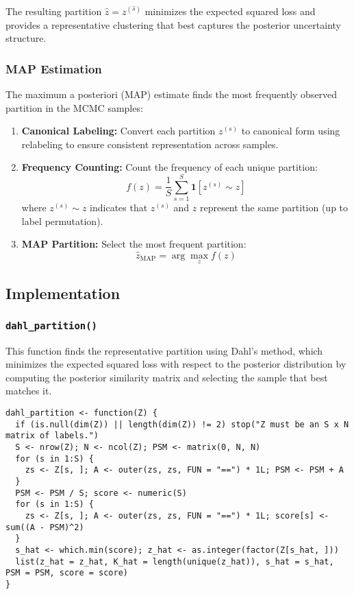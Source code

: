 \documentclass[11pt]{article}
\begin{document}
The resulting partition $\hat{z} = z^{(\hat{s})}$ minimizes the expected squared loss and provides a representative clustering that best captures the posterior uncertainty structure.

\subsubsection{MAP Estimation}

The maximum a posteriori (MAP) estimate finds the most frequently observed partition in the MCMC samples:

\begin{enumerate}
\item \textbf{Canonical Labeling:} Convert each partition $z^{(s)}$ to canonical form using relabeling to ensure consistent representation across samples.

\item \textbf{Frequency Counting:} Count the frequency of each unique partition:
\begin{equation}
f(z) = \frac{1}{S} \sum_{s=1}^S \mathbf{1}[z^{(s)} \sim z]
\end{equation}
where $z^{(s)} \sim z$ indicates that $z^{(s)}$ and $z$ represent the same partition (up to label permutation).

\item \textbf{MAP Partition:} Select the most frequent partition:
\begin{equation}
\hat{z}_{\text{MAP}} = \arg\max_{z} f(z)
\end{equation}
\end{enumerate}

\subsection{Implementation}

\subsubsection{\texttt{dahl\_partition()}}

This function finds the representative partition using Dahl's method, which minimizes the expected squared loss with respect to the posterior distribution by computing the posterior similarity matrix and selecting the sample that best matches it.

\begin{lstlisting}
dahl_partition <- function(Z) {
  if (is.null(dim(Z)) || length(dim(Z)) != 2) stop("Z must be an S x N matrix of labels.")
  S <- nrow(Z); N <- ncol(Z); PSM <- matrix(0, N, N)
  for (s in 1:S) { 
    zs <- Z[s, ]; A <- outer(zs, zs, FUN = "==") * 1L; PSM <- PSM + A 
  }
  PSM <- PSM / S; score <- numeric(S)
  for (s in 1:S) { 
    zs <- Z[s, ]; A <- outer(zs, zs, FUN = "==") * 1L; score[s] <- sum((A - PSM)^2) 
  }
  s_hat <- which.min(score); z_hat <- as.integer(factor(Z[s_hat, ]))
  list(z_hat = z_hat, K_hat = length(unique(z_hat)), s_hat = s_hat, PSM = PSM, score = score)
}
\end{lstlisting}
\end{document}
